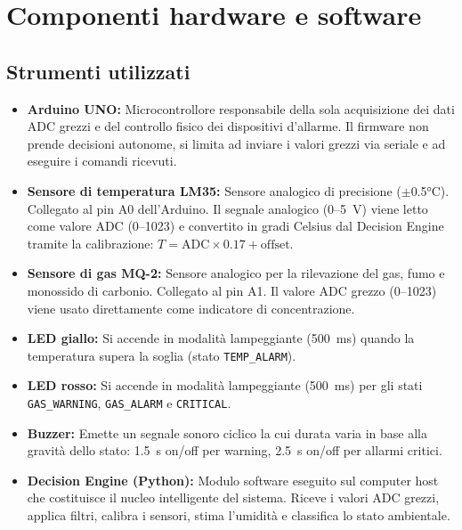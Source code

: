 \documentclass{article}
\begin{document}
\section{\Large Componenti hardware e software}

\subsection{Strumenti utilizzati}

\begin{itemize}
    \item \textbf{Arduino UNO:}
    Microcontrollore responsabile della sola acquisizione dei dati ADC grezzi e del controllo
    fisico dei dispositivi d'allarme. Il firmware non prende decisioni autonome, si limita
    ad inviare i valori grezzi via seriale e ad eseguire i comandi ricevuti.

    \item \textbf{Sensore di temperatura LM35:}
    Sensore analogico di precisione ($\pm$0.5°C). Collegato al pin A0 dell'Arduino.
    Il segnale analogico (0--5~V) viene letto come valore ADC (0--1023) e
    convertito in gradi Celsius dal Decision Engine tramite la calibrazione:
    $T = \text{ADC} \times 0.17 + \text{offset}$.

    \item \textbf{Sensore di gas MQ-2:}
    Sensore analogico per la rilevazione del gas, fumo e monossido
    di carbonio. Collegato al pin A1. Il valore ADC grezzo (0--1023) viene usato
    direttamente come indicatore di concentrazione.
    
    \item \textbf{LED giallo:}
    Si accende in modalità lampeggiante (500~ms) quando la temperatura supera
    la soglia (stato \texttt{TEMP\_ALARM}).

    \item \textbf{LED rosso:}
    Si accende in modalità lampeggiante (500~ms) per gli stati
    \texttt{GAS\_WARNING}, \texttt{GAS\_ALARM} e \texttt{CRITICAL}.

    \item \textbf{Buzzer:}
    Emette un segnale sonoro ciclico la cui durata varia in base alla gravità
    dello stato: 1.5~s on/off per warning, 2.5~s on/off per allarmi critici.

    \item \textbf{Decision Engine (Python):}
    Modulo software eseguito sul computer host che costituisce il nucleo
    intelligente del sistema. Riceve i valori ADC grezzi, applica filtri,
    calibra i sensori, stima l'umidità e classifica lo stato ambientale.


\end{itemize}
\end{document}
